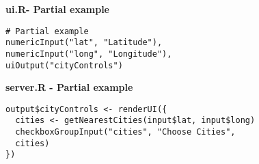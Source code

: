 \documentclass{beamer}
\begin{document}
\begin{frame}[fragile]
\textbf{ui.R- Partial example}
\begin{framed}
\begin{verbatim}
# Partial example
numericInput("lat", "Latitude"),
numericInput("long", "Longitude"),
uiOutput("cityControls")
\end{verbatim}  
\end{framed}
\textbf{server.R - Partial example}
\begin{framed}
\begin{verbatim}
output$cityControls <- renderUI({
  cities <- getNearestCities(input$lat, input$long)
  checkboxGroupInput("cities", "Choose Cities", 
  cities)
})
\end{verbatim}
\end{framed}
\end{frame}
\end{document}
